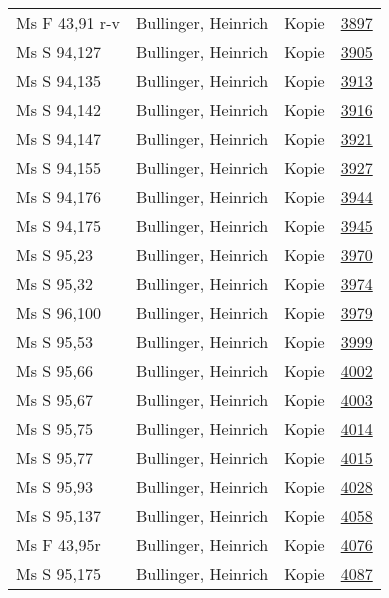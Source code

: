 \documentclass[10pt,a4paper,landscape]{report}
\begin{document}
\begin{longtable}{p{16cm}p{4cm}lr}
Ms F 43,91 r-v	&	Bullinger, Heinrich	&	Kopie	&	\href{http://130.60.24.72/assignment/3897}{3897}\\
Ms S 94,127	&	Bullinger, Heinrich	&	Kopie	&	\href{http://130.60.24.72/assignment/3905}{3905}\\
Ms S 94,135	&	Bullinger, Heinrich	&	Kopie	&	\href{http://130.60.24.72/assignment/3913}{3913}\\
Ms S 94,142	&	Bullinger, Heinrich	&	Kopie	&	\href{http://130.60.24.72/assignment/3916}{3916}\\
Ms S 94,147	&	Bullinger, Heinrich	&	Kopie	&	\href{http://130.60.24.72/assignment/3921}{3921}\\
Ms S 94,155	&	Bullinger, Heinrich	&	Kopie	&	\href{http://130.60.24.72/assignment/3927}{3927}\\
Ms S 94,176	&	Bullinger, Heinrich	&	Kopie	&	\href{http://130.60.24.72/assignment/3944}{3944}\\
Ms S 94,175	&	Bullinger, Heinrich	&	Kopie	&	\href{http://130.60.24.72/assignment/3945}{3945}\\
Ms S 95,23	&	Bullinger, Heinrich	&	Kopie	&	\href{http://130.60.24.72/assignment/3970}{3970}\\
Ms S 95,32	&	Bullinger, Heinrich	&	Kopie	&	\href{http://130.60.24.72/assignment/3974}{3974}\\
Ms S 96,100	&	Bullinger, Heinrich	&	Kopie	&	\href{http://130.60.24.72/assignment/3979}{3979}\\
Ms S 95,53	&	Bullinger, Heinrich	&	Kopie	&	\href{http://130.60.24.72/assignment/3999}{3999}\\
Ms S 95,66	&	Bullinger, Heinrich	&	Kopie	&	\href{http://130.60.24.72/assignment/4002}{4002}\\
Ms S 95,67	&	Bullinger, Heinrich	&	Kopie	&	\href{http://130.60.24.72/assignment/4003}{4003}\\
Ms S 95,75	&	Bullinger, Heinrich	&	Kopie	&	\href{http://130.60.24.72/assignment/4014}{4014}\\
Ms S 95,77	&	Bullinger, Heinrich	&	Kopie	&	\href{http://130.60.24.72/assignment/4015}{4015}\\
Ms S 95,93	&	Bullinger, Heinrich	&	Kopie	&	\href{http://130.60.24.72/assignment/4028}{4028}\\
Ms S 95,137	&	Bullinger, Heinrich	&	Kopie	&	\href{http://130.60.24.72/assignment/4058}{4058}\\
Ms F 43,95r	&	Bullinger, Heinrich	&	Kopie	&	\href{http://130.60.24.72/assignment/4076}{4076}\\
Ms S 95,175	&	Bullinger, Heinrich	&	Kopie	&	\href{http://130.60.24.72/assignment/4087}{4087}\\

\end{longtable}
\end{document}
